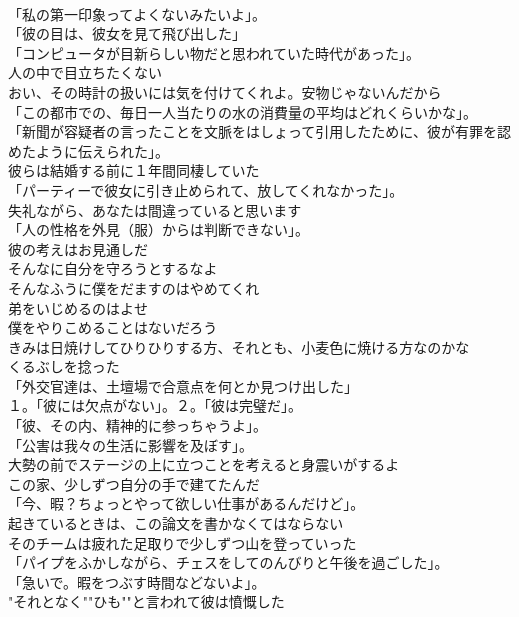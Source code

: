 \documentclass[8pt]{extreport}
\begin{document}
\begin{CJK}{UTF8}{min}
\\	「私の第一印象ってよくないみたいよ」。	
\\	「彼の目は、彼女を見て飛び出した」	
\\	「コンピュータが目新らしい物だと思われていた時代があった」。	
\\	人の中で目立ちたくない	
\\	おい、その時計の扱いには気を付けてくれよ。安物じゃないんだから	
\\	「この都市での、毎日一人当たりの水の消費量の平均はどれくらいかな」。	
\\	「新聞が容疑者の言ったことを文脈をはしょって引用したために、彼が有罪を認めたように伝えられた」。	
\\	彼らは結婚する前に１年間同棲していた	
\\	「パーティーで彼女に引き止められて、放してくれなかった」。	
\\	失礼ながら、あなたは間違っていると思います	
\\	「人の性格を外見（服）からは判断できない」。	
\\	彼の考えはお見通しだ	
\\	そんなに自分を守ろうとするなよ	
\\	そんなふうに僕をだますのはやめてくれ	
\\	弟をいじめるのはよせ	
\\	僕をやりこめることはないだろう	
\\	きみは日焼けしてひりひりする方、それとも、小麦色に焼ける方なのかな	
\\	くるぶしを捻った	
\\	「外交官達は、土壇場で合意点を何とか見つけ出した」	
\\	１。「彼には欠点がない」。２。「彼は完璧だ」。	
\\	「彼、その内、精神的に参っちゃうよ」。	
\\	「公害は我々の生活に影響を及ぼす」。	
\\	大勢の前でステージの上に立つことを考えると身震いがするよ	
\\	この家、少しずつ自分の手で建てたんだ	
\\	「今、暇？ちょっとやって欲しい仕事があるんだけど」。	
\\	起きているときは、この論文を書かなくてはならない	
\\	そのチームは疲れた足取りで少しずつ山を登っていった	
\\	「パイプをふかしながら、チェスをしてのんびりと午後を過ごした」。	
\\	「急いで。暇をつぶす時間などないよ」。	
\\	"それとなく""ひも""と言われて彼は憤慨した

\end{CJK}
\end{document}
